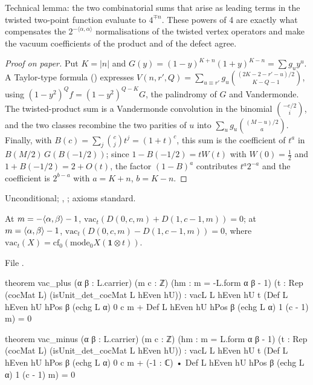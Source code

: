 \begin{physics}
Technical lemma: the two combinatorial sums that arise as leading terms in the twisted two-point function evaluate to $4^{\mp n}$. These powers of 4 are exactly what compensates the $2^{-\langle\alpha,\alpha\rangle}$ normalisations of the twisted vertex operators and make the vacuum coefficients of the product and of the defect agree.
\end{physics}
\begin{proof}[Proof on paper]
Put $K=|n|$ and $G(y)=(1-y)^{K+n}(1+y)^{K-n}=\sum g_uy^u$.  A Taylor-type formula
() expresses $V(n,r',Q)=\sum_{u\equiv r'}g_u\binom{(2K-2-r'-u)/2}{K-Q-1}$, using
$(1-y^2)^Qf=(1-y^2)^{Q-K}G$, the palindromy of $G$ and Vandermonde.  The twisted-product sum is a
Vandermonde convolution in the binomial $\binom{-e/2}{i}$, and the two classes recombine the two
parities of $u$ into $\sum_ug_u\binom{(M-u)/2}{a}$.  Finally, with $B(c)=\sum_j\binom cjt^j=(1+t)^c$,
this sum is the coefficient of $t^a$ in $B(M/2)\,G(B(-1/2))$; since $1-B(-1/2)=tW(t)$ with
$W(0)=\frac12$ and $1+B(-1/2)=2+O(t)$, the factor $(1-B)^{a}$ contributes $t^a2^{-a}$ and the
coefficient is $2^{b-a}$ with $a=K+n$, $b=K-n$.
\end{proof}
\begin{status}
Unconditional; , ;
axioms standard.
\end{status}

\begin{theorem}\label{ch08:thm:vac}
At $m=-\langle \alpha,\beta\rangle-1$, $\mathrm{vac}_t(D(0,c,m)+D(1,c-1,m))=0$; at $m=\langle \alpha,\beta\rangle-1$,
$\mathrm{vac}_t(D(0,c,m)-D(1,c-1,m))=0$, where $\mathrm{vac}_t(X)=\mathrm{cf}_0(\mathrm{mode}_0X(\mathbf 1\otimes t))$.
\end{theorem}
\noindent File .
\begin{leancode}
theorem vac_plus (α β : L.carrier) (m c : ℤ) (hm : m = -L.form α β - 1)
    (t : Rep (cocMat L) (isUnit_det_cocMat L hEven hU)) :
    vacL L hEven hU t (Def L hEven hU hPos β (echg L α) 0 c m
      + Def L hEven hU hPos β (echg L α) 1 (c - 1) m) = 0

theorem vac_minus (α β : L.carrier) (m c : ℤ) (hm : m = L.form α β - 1)
    (t : Rep (cocMat L) (isUnit_det_cocMat L hEven hU)) :
    vacL L hEven hU t (Def L hEven hU hPos β (echg L α) 0 c m
      + (-1 : ℂ) • Def L hEven hU hPos β (echg L α) 1 (c - 1) m) = 0
\end{leancode}

